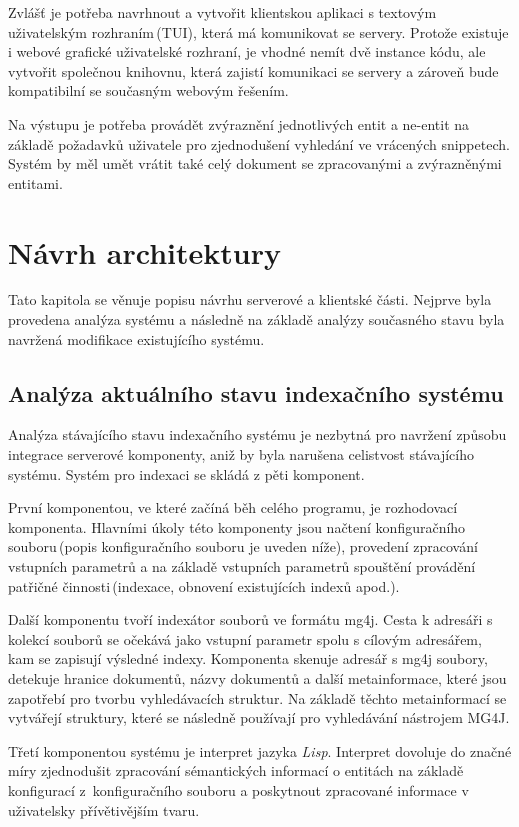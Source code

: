 Zvlášť je potřeba navrhnout a vytvořit klientskou aplikaci s textovým uživatelským rozhraním\,(TUI), která má komunikovat se servery. Protože existuje i webové grafické uživatelské rozhraní, je vhodné nemít dvě instance kódu, ale vytvořit společnou knihovnu, která zajistí komunikaci se servery a zároveň bude kompatibilní se současným webovým řešením.

Na výstupu je potřeba provádět zvýraznění jednotlivých entit a ne-entit na základě požadavků uživatele pro zjednodušení vyhledání ve vrácených snippetech. Systém by měl  umět vrátit také celý dokument se zpracovanými a zvýrazněnými entitami.




\chapter{Návrh architektury}
\label{chapter5}

Tato kapitola se věnuje popisu návrhu serverové a klientské části. Nejprve byla provedena analýza systému a následně na základě analýzy současného stavu byla navržená modifikace existujícího systému.  


\section{Analýza aktuálního stavu indexačního systému}
Analýza stávajícího stavu indexačního systému je nezbytná pro navržení způsobu integrace serverové komponenty, aniž by byla narušena celistvost stávajícího systému. Systém pro indexaci se skládá z pěti komponent.


První komponentou, ve které začíná běh celého programu, je rozhodovací komponenta. Hlavními úkoly této komponenty jsou načtení konfiguračního souboru\,(popis konfiguračního souboru je uveden níže), provedení zpracování vstupních parametrů a na základě vstupních parametrů spouštění provádění patřičné činnosti\,(indexace, obnovení existujících indexů apod.).


Další komponentu tvoří indexátor souborů ve formátu mg4j. Cesta k adresáři s kolekcí souborů se očekává jako vstupní parametr spolu s cílovým adresářem, kam se  zapisují výsledné indexy. Komponenta skenuje adresář s mg4j soubory, detekuje hranice dokumentů, názvy dokumentů a další metainformace, které jsou zapotřebí pro tvorbu vyhledávacích struktur. Na základě těchto metainformací se vytvářejí struktury, které se následně používají pro vyhledávání nástrojem MG4J.


Třetí komponentou systému je interpret jazyka \emph{Lisp}. Interpret dovoluje do značné míry zjednodušit zpracování sémantických informací o entitách na základě konfigurací z~konfiguračního souboru a poskytnout zpracované informace v uživatelsky přívětivějším tvaru.



